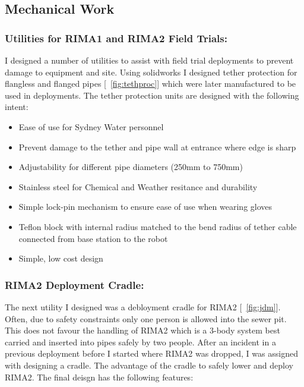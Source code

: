 \newpage
\subsection{Mechanical Work}

\subsubsection{Utilities for RIMA1 and RIMA2 Field Trials:}
I designed a number of utilities to assist with field trial deployments to prevent damage to equipment and site. Using solidworks I designed
tether protection for flangless and flanged pipes [~\ref{fig:tethproc}] which were later manufactured to be used in deployments. The tether protection units are designed with the following intent:

\begin{itemize}
    \item Ease of use for Sydney Water personnel
    \item Prevent damage to the tether and pipe wall at entrance where edge is sharp
    \item Adjustability for different pipe diameters (250mm to 750mm)
    \item Stainless steel for Chemical and Weather resitance and durability
    \item Simple lock-pin mechanism to ensure ease of use when wearing gloves
    \item Teflon block with internal radius matched to the bend radius of tether cable connected from base station to the robot
    \item Simple, low cost design
\end{itemize}


\newpage
\subsubsection{RIMA2 Deployment Cradle:}
The next utility I designed was a debloyment cradle for RIMA2 [~\ref{fig:jdm}]. Often, due to safety constraints only one person is allowed into the sewer pit. This does not favour the handling of RIMA2 which is a 3-body 
system best carried and inserted into pipes safely by two people. After an incident in a previous deployment before I started where RIMA2 was dropped, I was assigned with designing a cradle. The advantage 
of the cradle to safely lower and deploy RIMA2. The final deisgn has the following features:


